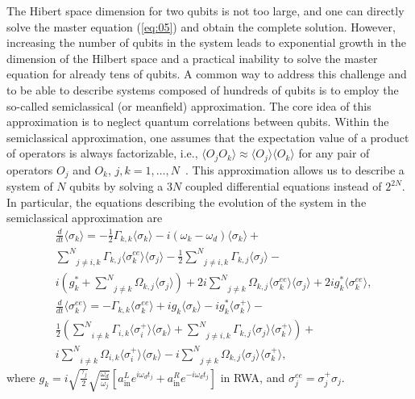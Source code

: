\documentclass[lettersize,journal]{IEEEtran}
\begin{document}
The Hibert space dimension for two qubits is not too large, and one can directly solve the master equation (\ref{eq:05}) and obtain the complete solution.
However, increasing the number of qubits in the system leads to exponential growth in the dimension of the Hilbert space and a practical inability to solve the master equation for already tens of qubits.
A common way to address this challenge and to be able to describe systems composed of hundreds of qubits is to employ the so-called semiclassical (or meanfield) approximation. 
The core idea of this approximation is to neglect quantum correlations between qubits.
Within the semiclassical approximation, one assumes that the expectation value of a product of operators is always factorizable, i.e., $\langle O_j O_k \rangle \approx \langle O_j \rangle \langle O_k \rangle$ for any pair of operators $O_j$ and $O_k$, $j,k = 1, \ldots, N$~\cite{scully1999quantum, carmichael1999statistical}. 
This approximation allows us to describe a system of $N$ qubits by solving a $3N$ coupled differential equations instead of $2^{2N}$. 
In particular, the equations describing the evolution of the system in the semiclassical approximation are 
\begin{align} \label{eq:24}
&\frac{d}{dt} \langle {\sigma}_{k}\rangle  = -\frac{1}{2} {\Gamma}_{k,k} \langle {\sigma}_{k}\rangle  - i \left( {\omega}_{k} - \omega_{d} \right) \langle {\sigma}_{k}\rangle + \nonumber \\
&\underset{j{\ne}i,k}{\overset{N}{\sum}} {\Gamma}_{k,j}  \langle {\sigma}_{k}^{{ee}}\rangle   \langle {\sigma}_{j}\rangle  -\frac{1}{2} \underset{j{\ne}i,k}{\overset{N}{\sum}} {\Gamma}_{k,j}  \langle {\sigma}_{j}\rangle  - \\
&i \left( g^*_{k} + \underset{j{\ne}k}{\overset{N}{\sum}} {\Omega}_{k,j}  \langle {\sigma}_{j}\rangle  \right) + 2 i \underset{j{\ne}k}{\overset{N}{\sum}} {\Omega}_{k,j}  \langle {\sigma}_{k}^{{ee}}\rangle   \langle {\sigma}_{j}\rangle  + 2 i g^*_{k} \langle {\sigma}_{k}^{{ee}}\rangle, \nonumber  \\
&\frac{d}{dt} \langle {\sigma}_{k}^{{ee}}\rangle  = - {\Gamma}_{k,k} \langle {\sigma}_{k}^{{ee}}\rangle  +  i {g}_{k} \langle {\sigma}_{k}\rangle   - i g^*_{k} \langle {\sigma}_{k}^+\rangle - \nonumber \\
&\frac{1}{2} \left( \underset{i{\ne}k}{\overset{N}{\sum}} {\Gamma}_{i,k}  \langle {\sigma}_{i}^+\rangle   \langle {\sigma}_{k}\rangle  + \underset{j{\ne}i,k}{\overset{N}{\sum}} {\Gamma}_{k,j}  \langle {\sigma}_{j}\rangle   \langle {\sigma}_{k}^+\rangle  \right) + \\
&i \underset{i{\ne}k}{\overset{N}{\sum}} {\Omega}_{i,k}  \langle {\sigma}_{i}^+\rangle   \langle {\sigma}_{k}\rangle  - i \underset{j{\ne}k}{\overset{N}{\sum}} {\Omega}_{k,j}  \langle {\sigma}_{j}\rangle   \langle {\sigma}_{k}^+\rangle, \nonumber
\end{align}
where $g_k = i \sqrt{\frac{\gamma_j}{2}} \sqrt{\frac{\omega_d}{\omega_j}} \left[ a_\mathrm{in}^L e^{i \omega_d t_j} + a_\mathrm{in}^R e^{-i \omega_d t_j} \right]$ in RWA, and $\sigma_j^{ee} = \sigma_j^+ \sigma_j$.
\end{document}
